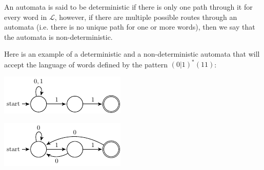 An automata is said to be deterministic if there is only one path through it for
every word in $\mathcal{L}$, however, if there are multiple possible routes
through an automata (i.e. there is no unique path for one or more words), then
we say that the automata is non-deterministic.

Here is an example of a deterministic and a non-deterministic automata that will
accept the language of words defined by the pattern $(0|1)^*(11)$:

\begin{center}
	\includegraphics{automata/3.pdf}
\end{center}

\begin{center}
	\includegraphics{automata/4.pdf}
\end{center}